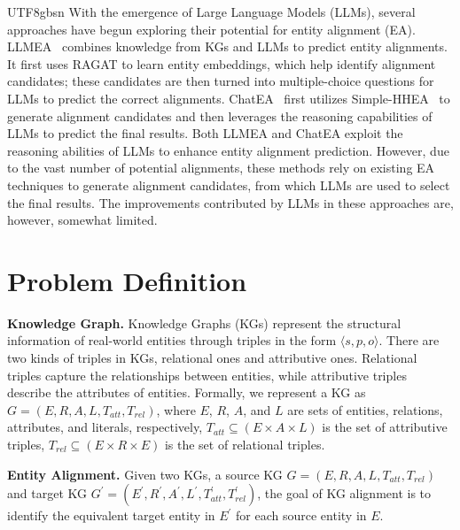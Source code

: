 \documentclass[preprint,12pt]{elsarticle}
\begin{document}
\begin{CJK}{UTF8}{gbsn}
With the emergence of Large Language Models (LLMs), several approaches have begun exploring their potential for entity alignment (EA). LLMEA~\cite{LLMEA} combines knowledge from KGs and LLMs to predict entity alignments. It first uses RAGAT to learn entity embeddings, which help identify alignment candidates; these candidates are then turned into multiple-choice questions for LLMs to predict the correct alignments. ChatEA~\cite{ChatEA} first utilizes Simple-HHEA~\cite{simple-hhea} to generate alignment candidates and then leverages the reasoning capabilities of LLMs to predict the final results. Both LLMEA and ChatEA exploit the reasoning abilities of LLMs to enhance entity alignment prediction. However, due to the vast number of potential alignments, these methods rely on existing EA techniques to generate alignment candidates, from which LLMs are used to select the final results. The improvements contributed by LLMs in these approaches are, however, somewhat limited.


\section{Problem Definition}
\label{sec:PRELIMINARIES}
\noindent\textbf{Knowledge Graph.} Knowledge Graphs (KGs) represent the structural information of real-world entities through triples in the form $\langle s, p, o\rangle$. There are two kinds of triples in KGs, relational ones and attributive ones. Relational triples capture the relationships between entities, while attributive triples describe the attributes of entities. Formally, we represent a KG as $G=(E,R,A,L,T_{att},T_{rel})$, where $E$, $R$, $A$, and $L$ are sets of entities, relations, attributes, and literals, respectively, $T_{att}\subseteq (E \times A \times L)$ is the set of attributive triples, $T_{rel} \subseteq (E \times R \times E)$ is the set of relational triples.

\noindent\textbf{Entity Alignment.} Given two KGs, a source KG $G = (E,R,A,L,T_{att},T_{rel})$ and target KG
$G^{\prime} = (E^{\prime}, R^{\prime}, A^{\prime},L^{\prime}, T_{att}^{\prime},T_{rel}^{\prime})$, the goal of KG alignment is to identify the equivalent target entity in $E^{\prime}$ for each source entity in $E$. 



\end{CJK}
\end{document}
